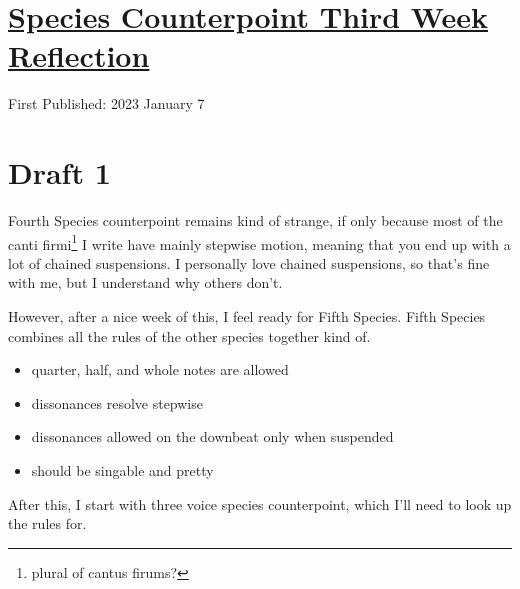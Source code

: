 \documentclass[12pt]{article}[titlepage]
\newcommand{\1}{\={a}}
\newcommand{\2}{\={e}}
\newcommand{\3}{\={\i}}
\newcommand{\4}{\=o}
\newcommand{\5}{\=u}
\newcommand{\6}{\={A}}
\renewcommand{\,}{\textsuperscript{,}}
\begin{document}
\doublespacing
\section{\href{species-counterpoint-week-3.html}{Species Counterpoint Third Week Reflection}}
First Published: 2023 January 7
\section{Draft 1}
Fourth Species counterpoint remains kind of strange, if only because most of the canti firmi\footnote{plural of cantus firums?} I write have mainly stepwise motion, meaning that you end up with a lot of chained suspensions.
I personally love chained suspensions, so that's fine with me, but I understand why others don't.

However, after a nice week of this, I feel ready for Fifth Species.
Fifth Species combines all the rules of the other species together kind of.
\begin{itemize}
\item quarter, half, and whole notes are allowed
\item dissonances resolve stepwise
\item dissonances allowed on the downbeat only when suspended
\item should be singable and pretty
\end{itemize}
After this, I start with three voice species counterpoint, which I'll need to look up the rules for.
\end{document}
